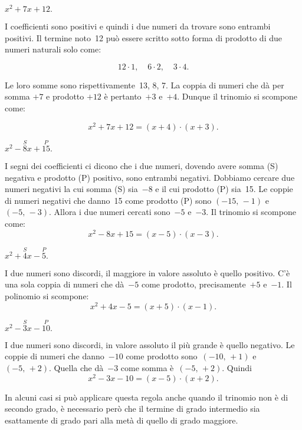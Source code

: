 \begin{exrig}
 \begin{esempio}
 $x^{2}+7x+12.$

 I coefficienti sono positivi e quindi i due numeri da trovare sono
entrambi positivi.
Il termine noto~12 può essere scritto sotto forma di prodotto di due
numeri naturali solo come:

\[12\cdot 1\text{,}\quad~6\cdot 2\text{,}\quad~3\cdot 4.\]

Le loro somme sono rispettivamente~13, 8, 7. La coppia di numeri che
dà per somma $+7$ e prodotto $+12$ è pertanto~$+3$ e~$+4$. Dunque il
trinomio si scompone come:

\[x^{2}+7x+12=\left(x+4\right)\cdot \left(x+3\right).\]
 \end{esempio}

 \begin{esempio}
 $x^{2}-\overset{S}{8}x+\overset{P}{15}.$

I segni dei coefficienti ci dicono che i due numeri, dovendo avere somma (S)
negativa e prodotto (P) positivo, sono entrambi negativi. Dobbiamo cercare
due numeri negativi la cui somma (S) sia~$-8$ e il cui prodotto (P) sia~15. Le
coppie di numeri negativi che danno~15 come prodotto (P) sono $(-15\text{,~}-1)$ e~$(-5\text{,~}-3)$.
Allora i due numeri cercati sono~$-5$ e~$-3$. Il trinomio si scompone
come:
\[x^{2}-8x+15=\left(x-5\right)\cdot \left(x-3\right).\]
 \end{esempio}

\begin{esempio}
 $x^{2}+\overset{S}{4}x-\overset{P}{5}.$

I due numeri sono discordi, il maggiore in valore assoluto è quello
positivo. C'è una sola coppia di numeri che dà~$-5$
come prodotto, precisamente~$+5$ e~$-1$. Il polinomio si scompone:
\[x^{2}+4x-5=\left(x+5\right)\cdot \left(x-1\right).\]
\end{esempio}

\begin{esempio}
 $x^{2}-\overset{S}{3}x-\overset{P}{10}.$

I due numeri sono discordi, in valore assoluto il più grande è quello
negativo. Le coppie di numeri che danno~$-10$ come prodotto sono~$(-10\text{,~}+1)$ e
$(-5\text{,~}+2)$. Quella che dà~$-3$ come somma è~$(-5\text{,~}+2)$. Quindi
\[x^{2}-3x-10=\left(x-5\right)\cdot \left(x+2\right).\]
\end{esempio}

\begin{esempio}
 In alcuni casi si può applicare questa regola anche quando il trinomio
non è di secondo grado, è necessario però che il termine di grado
intermedio sia esattamente di grado pari alla metà di quello di grado
maggiore.


\end{esempio}
\end{exrig}
